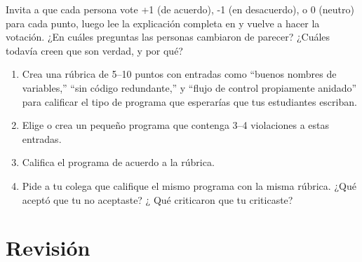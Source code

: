 Invita a que cada persona vote +1 (de acuerdo), -1 (en desacuerdo), o 0 (neutro) para cada punto,
luego lee la explicación completa en
y vuelve a hacer la votación.
¿En cuáles preguntas las personas cambiaron de parecer?
¿Cuáles todavía creen que son verdad, y por qué?


\begin{enumerate}

\item
  Crea una rúbrica de 5--10 puntos
  con entradas como ``buenos nombres de variables,'' ``sin código redundante,'' y ``flujo de control propiamente anidado''
  para calificar el tipo de programa que esperarías que tus estudiantes escriban.

\item
  Elige o crea un pequeño programa que contenga 3--4 violaciones a estas entradas.

\item
  Califica el programa de acuerdo a la rúbrica.

\item
  Pide a tu colega que califique el mismo programa con la misma rúbrica.
  ¿Qué aceptó que tu no aceptaste?
 ¿ Qué criticaron que tu criticaste?

\end{enumerate}

\section*{Revisión}

